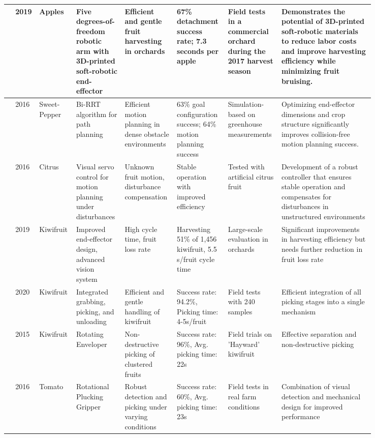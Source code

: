 \documentclass[a4paper,fleqn]{cas-dc}
\begin{document}
\begin{table}
\begin{tabular}{p{0.025\linewidth} p{0.025\linewidth} p{0.07\linewidth} p{0.12\linewidth} p{0.12\linewidth} p{0.12\linewidth} p{0.12\linewidth} p{0.24\linewidth}}
\cite{hohimer2019design} & 2019 & Apples & Five degrees-of-freedom robotic arm with 3D-printed soft-robotic end-effector & Efficient and gentle fruit harvesting in orchards & 67\% detachment success rate; 7.3 seconds per apple & Field tests in a commercial orchard during the 2017 harvest season & Demonstrates the potential of 3D-printed soft-robotic materials to reduce labor costs and improve harvesting efficiency while minimizing fruit bruising. \\ \midrule
\cite{bac2016analysis} & 2016 & Sweet-Pepper & Bi-RRT algorithm for path planning & Efficient motion planning in dense obstacle environments & 63\% goal configuration success; 64\% motion planning success & Simulation-based on greenhouse measurements & Optimizing end-effector dimensions and crop structure significantly improves collision-free motion planning success. \\ \midrule
\cite{mehta2016robust} & 2016 & Citrus & Visual servo control for motion planning under disturbances & Unknown fruit motion, disturbance compensation & Stable operation with improved efficiency & Tested with artificial citrus fruit & Development of a robust controller that ensures stable operation and compensates for disturbances in unstructured environments \\ \midrule
\cite{williams2020improvements} & 2019 & Kiwifruit & Improved end-effector design, advanced vision system & High cycle time, fruit loss rate & Harvesting 51\% of 1,456 kiwifruit, 5.5 s/fruit cycle time & Large-scale evaluation in orchards & Significant improvements in harvesting efficiency but needs further reduction in fruit loss rate \\ \midrule
\cite{mu2020design} & 2020 & Kiwifruit & Integrated grabbing, picking, and unloading & Efficient and gentle handling of kiwifruit & Success rate: 94.2\%, Picking time: 4-5s/fruit & Field tests with 240 samples & Efficient integration of all picking stages into a single mechanism \\ \midrule
\cite{longsheng2015development} & 2015 & Kiwifruit & Rotating Enveloper & Non-destructive picking of clustered fruits & Success rate: 96\%, Avg. picking time: 22s & Field trials on 'Hayward' kiwifruit & Effective separation and non-destructive picking \\ \midrule
\cite{yaguchi2016development} & 2016 & Tomato & Rotational Plucking Gripper & Robust detection and picking under varying conditions & Success rate: 60\%, Avg. picking time: 23s & Field tests in real farm conditions & Combination of visual detection and mechanical design for improved performance \\
\bottomrule
\end{tabular}
\end{table}
\end{document}
